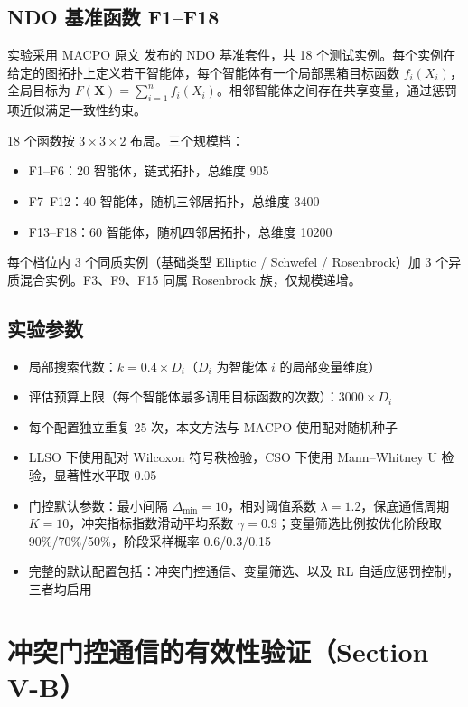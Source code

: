 \documentclass[11pt,a4paper]{ctexart}
\begin{document}
\subsection{NDO 基准函数 F1--F18}
实验采用 MACPO 原文\cite{ref_macpo} 发布的 NDO 基准套件，共 18 个测试实例。每个实例在给定的图拓扑上定义若干智能体，每个智能体有一个局部黑箱目标函数 $f_i(X_i)$，全局目标为 $F(\mathbf{X})=\sum_{i=1}^n f_i(X_i)$。相邻智能体之间存在共享变量，通过惩罚项近似满足一致性约束。

18 个函数按 $3\times3\times2$ 布局。三个规模档：
\begin{itemize}
  \item F1--F6：20 智能体，链式拓扑，总维度 905
  \item F7--F12：40 智能体，随机三邻居拓扑，总维度 3400
  \item F13--F18：60 智能体，随机四邻居拓扑，总维度 10200
\end{itemize}
每个档位内 3 个同质实例（基础类型 Elliptic / Schwefel / Rosenbrock）加 3 个异质混合实例。F3、F9、F15 同属 Rosenbrock 族，仅规模递增。

\subsection{实验参数}
\begin{itemize}
  \item 局部搜索代数：$k = 0.4 \times D_i$（$D_i$ 为智能体 $i$ 的局部变量维度）
  \item 评估预算上限（每个智能体最多调用目标函数的次数）：$3000 \times D_i$
  \item 每个配置独立重复 25 次，本文方法与 MACPO 使用配对随机种子
  \item LLSO 下使用配对 Wilcoxon 符号秩检验，CSO 下使用 Mann--Whitney U 检验，显著性水平取 0.05
  \item 门控默认参数：最小间隔 $\Delta_{\min}=10$，相对阈值系数 $\lambda=1.2$，保底通信周期 $K=10$，冲突指标指数滑动平均系数 $\gamma=0.9$；变量筛选比例按优化阶段取 90\%/70\%/50\%，阶段采样概率 0.6/0.3/0.15
  \item 完整的默认配置包括：冲突门控通信、变量筛选、以及 RL 自适应惩罚控制，三者均启用
\end{itemize}

\section{冲突门控通信的有效性验证（Section V-B）}
\end{document}
